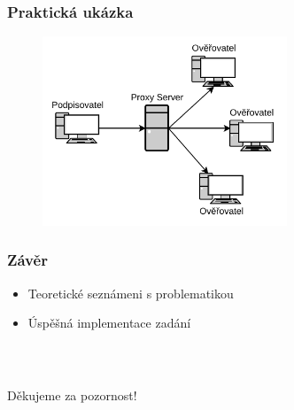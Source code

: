 \documentclass[%
  12pt,       				%
	t,                  %
	aspectratio=1610,   %
	unicode,						%
]{beamer}				    	%
\begin{document}
\begin{frame}[c] 
    
	\frametitle{Praktická ukázka}
	\begin{center}
		\begin{figure}[htbp]
  \centering
  \includegraphics[width=0.65\textwidth]{img/network_diagram.pdf}
  
  
\end{figure}
	\end{center}
\end{frame}

\begin{frame}[c] 

	\frametitle{Závěr}
	\large{
    \begin{itemize}
        \item Teoretické seznámeni s problematikou
        
        \item Úspěšná implementace zadání
        
        
    \end{itemize}
    }
\end{frame}


\begin{frame}[c] 

	\frametitle{\mbox{ }}
	\begin{center}
		{\Huge Děkujeme za pozornost!}
	\end{center}
\end{frame}
\end{document}
